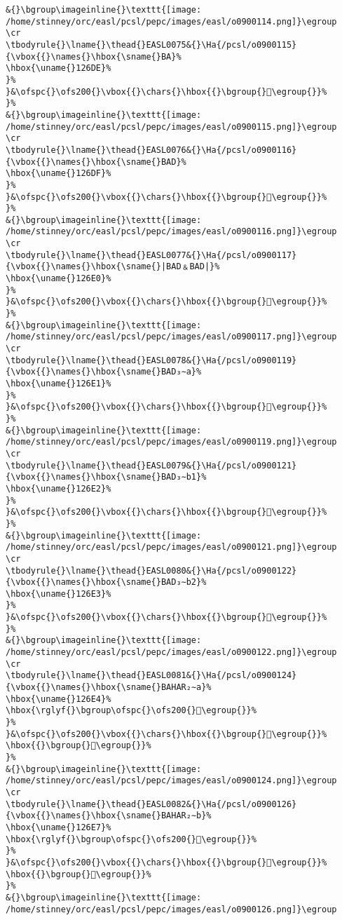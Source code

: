 \begin{verbatim}
&{}\bgroup\imageinline{}\texttt{[image: /home/stinney/orc/easl/pcsl/pepc/images/easl/o0900114.png]}\egroup
\cr
\tbodyrule{}\lname{}\thead{}EASL0075&{}\Ha{/pcsl/o0900115}{\vbox{{}\names{}\hbox{\sname{}BA}%
\hbox{\uname{}126DE}%
}%
}&\ofspc{}\ofs200{}\vbox{{}\chars{}\hbox{{}\bgroup{}𒛞\egroup{}}%
}%
&{}\bgroup\imageinline{}\texttt{[image: /home/stinney/orc/easl/pcsl/pepc/images/easl/o0900115.png]}\egroup
\cr
\tbodyrule{}\lname{}\thead{}EASL0076&{}\Ha{/pcsl/o0900116}{\vbox{{}\names{}\hbox{\sname{}BAD}%
\hbox{\uname{}126DF}%
}%
}&\ofspc{}\ofs200{}\vbox{{}\chars{}\hbox{{}\bgroup{}𒛟\egroup{}}%
}%
&{}\bgroup\imageinline{}\texttt{[image: /home/stinney/orc/easl/pcsl/pepc/images/easl/o0900116.png]}\egroup
\cr
\tbodyrule{}\lname{}\thead{}EASL0077&{}\Ha{/pcsl/o0900117}{\vbox{{}\names{}\hbox{\sname{}|BAD﹠BAD|}%
\hbox{\uname{}126E0}%
}%
}&\ofspc{}\ofs200{}\vbox{{}\chars{}\hbox{{}\bgroup{}𒛠\egroup{}}%
}%
&{}\bgroup\imageinline{}\texttt{[image: /home/stinney/orc/easl/pcsl/pepc/images/easl/o0900117.png]}\egroup
\cr
\tbodyrule{}\lname{}\thead{}EASL0078&{}\Ha{/pcsl/o0900119}{\vbox{{}\names{}\hbox{\sname{}BAD₃∼a}%
\hbox{\uname{}126E1}%
}%
}&\ofspc{}\ofs200{}\vbox{{}\chars{}\hbox{{}\bgroup{}𒛡\egroup{}}%
}%
&{}\bgroup\imageinline{}\texttt{[image: /home/stinney/orc/easl/pcsl/pepc/images/easl/o0900119.png]}\egroup
\cr
\tbodyrule{}\lname{}\thead{}EASL0079&{}\Ha{/pcsl/o0900121}{\vbox{{}\names{}\hbox{\sname{}BAD₃∼b1}%
\hbox{\uname{}126E2}%
}%
}&\ofspc{}\ofs200{}\vbox{{}\chars{}\hbox{{}\bgroup{}𒛢\egroup{}}%
}%
&{}\bgroup\imageinline{}\texttt{[image: /home/stinney/orc/easl/pcsl/pepc/images/easl/o0900121.png]}\egroup
\cr
\tbodyrule{}\lname{}\thead{}EASL0080&{}\Ha{/pcsl/o0900122}{\vbox{{}\names{}\hbox{\sname{}BAD₃∼b2}%
\hbox{\uname{}126E3}%
}%
}&\ofspc{}\ofs200{}\vbox{{}\chars{}\hbox{{}\bgroup{}𒛣\egroup{}}%
}%
&{}\bgroup\imageinline{}\texttt{[image: /home/stinney/orc/easl/pcsl/pepc/images/easl/o0900122.png]}\egroup
\cr
\tbodyrule{}\lname{}\thead{}EASL0081&{}\Ha{/pcsl/o0900124}{\vbox{{}\names{}\hbox{\sname{}BAHAR₂∼a}%
\hbox{\uname{}126E4}%
\hbox{\rglyf{}\bgroup\ofspc{}\ofs200{}𒛤\egroup{}}%
}%
}&\ofspc{}\ofs200{}\vbox{{}\chars{}\hbox{{}\bgroup{}𒛤\egroup{}}%
\hbox{{}\bgroup{}𒛥\egroup{}}%
}%
&{}\bgroup\imageinline{}\texttt{[image: /home/stinney/orc/easl/pcsl/pepc/images/easl/o0900124.png]}\egroup
\cr
\tbodyrule{}\lname{}\thead{}EASL0082&{}\Ha{/pcsl/o0900126}{\vbox{{}\names{}\hbox{\sname{}BAHAR₂∼b}%
\hbox{\uname{}126E7}%
\hbox{\rglyf{}\bgroup\ofspc{}\ofs200{}𒛧\egroup{}}%
}%
}&\ofspc{}\ofs200{}\vbox{{}\chars{}\hbox{{}\bgroup{}𒛦\egroup{}}%
\hbox{{}\bgroup{}𒛧\egroup{}}%
}%
&{}\bgroup\imageinline{}\texttt{[image: /home/stinney/orc/easl/pcsl/pepc/images/easl/o0900126.png]}\egroup

\end{verbatim}
